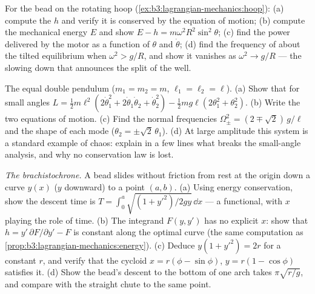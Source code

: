 \begin{exercise}[$\star\star$]\label{exo:b3:lagrangian-mechanics:9}
For the bead on the rotating hoop
(\cref{ex:b3:lagrangian-mechanics:hoop}): (a) compute the  $h$ and verify it is conserved by the equation of motion; (b)
compute the mechanical energy $E$ and show $E - h =
m\omega^2R^2\sin^2\theta$; (c) find the power delivered by the motor as
a function of $\theta$ and $\dot\theta$; (d) find the frequency of
 about the tilted equilibrium when $\omega^2 > g/R$,
and show it vanishes as $\omega^2 \to g/R$ --- the slowing down that
announces the split of the well.
\end{exercise}

\begin{exercise}[$\star\star\star$]\label{exo:b3:lagrangian-mechanics:10}
The equal double pendulum ($m_1 = m_2 = m$, $\ell_1 = \ell_2 = \ell$).
(a) Show that for small angles $L = \tfrac12 m\ell^2(2\dot\theta_1^2 +
2\dot\theta_1\dot\theta_2 + \dot\theta_2^2) - \tfrac12 mg\ell(2
\theta_1^2 + \theta_2^2)$. (b) Write the two equations of motion. (c)
Find the normal frequencies $\Omega_\pm^2 = (2 \mp \sqrt2)\,g/\ell$ and
the shape of each mode ($\theta_2 = \pm\sqrt2\,\theta_1$). (d) At large
amplitude this system is a standard example of chaos: explain in a few
lines what breaks the small-angle analysis, and why no conservation law
is lost.
\end{exercise}

\begin{exercise}[$\star\star\star$]\label{exo:b3:lagrangian-mechanics:11}
\emph{The brachistochrone.} A bead slides without friction from rest at
the origin down a curve $y(x)$ ($y$ downward) to a point $(a, b)$. (a)
Using energy conservation, show the descent time is $T =
\int_0^a\sqrt{(1 + y'^2)/2gy}\,\dd x$ --- a functional, with $x$
playing the role of time. (b) The integrand $F(y, y')$ has no explicit
$x$: show that $h = y'\,\partial F/\partial y' - F$ is constant along
the optimal curve (the same computation as
\cref{prop:b3:lagrangian-mechanics:energy}). (c) Deduce $y(1 + y'^2) =
2r$ for a constant $r$, and verify that the cycloid $x = r(\phi -
\sin\phi)$, $y = r(1 - \cos\phi)$ satisfies it. (d) Show the bead's
descent to the bottom of one arch takes $\pi\sqrt{r/g}$, and compare
with the straight chute to the same point.
\end{exercise}

